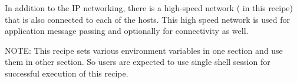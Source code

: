  In addition to the IP networking, there is a high-speed network
(\InfiniBand{} in this recipe) that is also connected to each of the
hosts. This high speed network is used for application message passing and
optionally for \Lustre{} connectivity as well.

NOTE: This recipe sets various environment variables in one section and use them in other section. So users are expected to use single shell session for successful execution of this recipe. 


